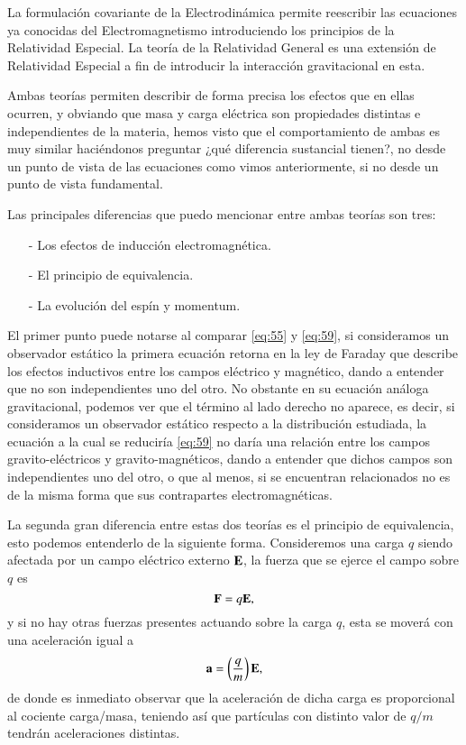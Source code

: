 La formulación covariante de la Electrodinámica permite reescribir las ecuaciones ya conocidas del Electromagnetismo introduciendo los principios de la Relatividad Especial. La teoría de la Relatividad General es una extensión de Relatividad Especial a fin de introducir la interacción gravitacional en esta.

Ambas teorías permiten describir de forma precisa los efectos que en ellas ocurren, y obviando que masa y carga eléctrica son propiedades distintas e independientes de la materia, hemos visto que el comportamiento de ambas es muy similar haciéndonos preguntar ¿qué diferencia sustancial tienen?, no desde un punto de vista de las ecuaciones como vimos anteriormente, si no desde un punto de vista fundamental.

Las principales diferencias que puedo mencionar entre ambas teorías son tres:
\begin{itemize}
\item[-] Los efectos de inducción electromagnética.
\item[-] El principio de equivalencia.
\item[-] La evolución del espín y momentum.
\end{itemize}

El primer punto puede notarse al comparar \eqref{eq:55} y \eqref{eq:59}, si consideramos un observador estático la primera ecuación retorna en la ley de Faraday que describe los efectos inductivos entre los campos eléctrico y magnético, dando a entender que no son independientes uno del otro. No obstante en su ecuación análoga gravitacional, podemos ver que el término al lado derecho no aparece, es decir, si consideramos un observador estático respecto a la distribución estudiada, la ecuación a la cual se reduciría \eqref{eq:59} no daría una relación entre los campos gravito-eléctricos y gravito-magnéticos, dando a entender que dichos campos son independientes uno del otro, o que al menos, si se encuentran relacionados no es de la misma forma que sus contrapartes electromagnéticas.

La segunda gran diferencia entre estas dos teorías es el principio de equivalencia, esto podemos entenderlo de la siguiente forma. Consideremos una carga $q$ siendo afectada por un campo eléctrico externo $\vb{E}$, la fuerza que se ejerce el campo sobre $q$ es
\begin{equation}
\vb{F} = q \vb{E},
\end{equation}
y si no hay otras fuerzas presentes actuando sobre la carga $q$, esta se moverá con una aceleración igual a
\begin{equation}
\vb{a} = \left( \frac{q}{m} \right) \vb{E},
\end{equation}
de donde es inmediato observar que la aceleración de dicha carga es proporcional al cociente carga/masa, teniendo así que partículas con  distinto valor de $q/m$ tendrán aceleraciones distintas.


